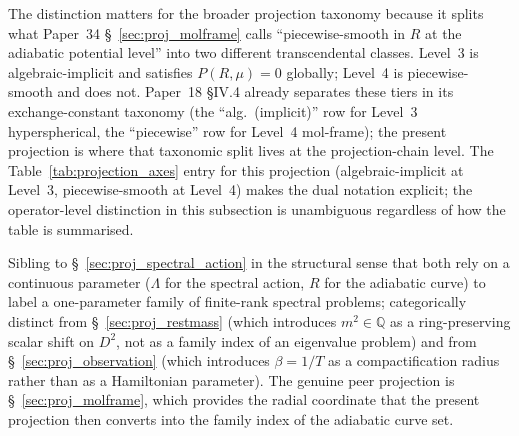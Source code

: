 \documentclass[11pt]{article}
\begin{document}
The distinction matters for the broader projection taxonomy because
it splits what Paper~34 \S~\ref{sec:proj_molframe} calls
``piecewise-smooth in $R$ at the adiabatic potential level'' into two
different transcendental classes.  Level~3 is algebraic-implicit and
satisfies $P(R, \mu) = 0$ globally; Level~4 is piecewise-smooth and
does not.  Paper~18 §IV.4 already separates these tiers in its
exchange-constant taxonomy (the ``alg.\ (implicit)'' row for Level~3
hyperspherical, the ``piecewise'' row for Level~4 mol-frame); the
present projection is where that taxonomic split lives at the
projection-chain level.  The Table~\ref{tab:projection_axes} entry for
this projection (algebraic-implicit at Level~3, piecewise-smooth at
Level~4) makes the dual notation explicit; the operator-level
distinction in this subsection is unambiguous regardless of how the
table is summarised.

Sibling to \S~\ref{sec:proj_spectral_action} in the structural sense
that both rely on a continuous parameter ($\Lambda$ for the spectral
action, $R$ for the adiabatic curve) to label a one-parameter family
of finite-rank spectral problems; categorically distinct from
\S~\ref{sec:proj_restmass} (which introduces $m^2 \in \mathbb{Q}$ as a
ring-preserving scalar shift on $D^2$, not as a family index of an
eigenvalue problem) and from \S~\ref{sec:proj_observation} (which
introduces $\beta = 1/T$ as a compactification radius rather than as
a Hamiltonian parameter).  The genuine peer projection is
\S~\ref{sec:proj_molframe}, which provides the radial coordinate that
the present projection then converts into the family index of the
adiabatic curve set.
\end{document}
